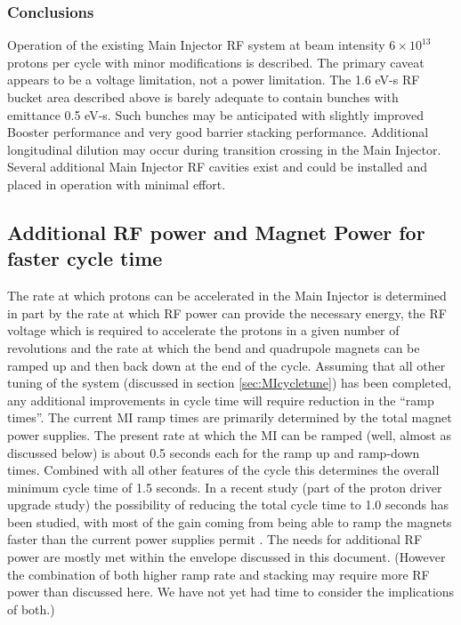 \documentclass{article}
\begin{document}
\subsubsection {Conclusions}

Operation of the existing Main Injector RF system at beam intensity 
$6 \times 10^{13}$ 
protons per cycle with minor modifications is described.  The primary caveat 
appears to be a voltage limitation, not a power limitation.  The 1.6 eV-s RF 
bucket 
area described above is barely adequate to contain bunches with emittance 0.5 
eV-s. Such bunches may be anticipated with slightly improved Booster 
performance and very good barrier stacking performance.  Additional 
longitudinal dilution may occur during transition crossing in the Main 
Injector. Several additional Main Injector RF cavities exist and could be 
installed and placed in operation with minimal effort. 

\subsection {Additional RF power and Magnet Power for faster cycle time}
\label{sec:MIcycleramp}
   The rate at which protons can be accelerated in the Main Injector is
determined in part 
by the rate at which RF power can provide the necessary energy,
the RF voltage which is required to accelerate the protons in a given number
of revolutions and the rate at which the bend and quadrupole magnets can be
ramped up and then back down at the end of the cycle. Assuming that all other
tuning of the system (discussed in section \ref {sec:MIcycletune}) has been
completed, any additional improvements in cycle time will require reduction
in the ``ramp times''. The current MI ramp times are primarily determined by
the total magnet power supplies. The present rate at which the MI can be
ramped (well, almost as discussed below) is about 0.5 seconds each for the ramp
up and ramp-down times. Combined with all other features of the cycle this
determines the overall minimum cycle time of 1.5 seconds. In a recent study
(part of the proton driver upgrade study) the possibility of reducing the
total cycle time to 1.0 seconds has been studied, with most of the gain
coming from being able to ramp the magnets faster than the current power 
supplies permit \cite {PDstudy, Wolff, Mishra}. The needs for additional
RF power are mostly met within the envelope discussed in this document.
(However the combination of both higher ramp rate and stacking may require
more RF power than discussed here. We have not yet had time to consider
the implications of both.)
\end{document}
